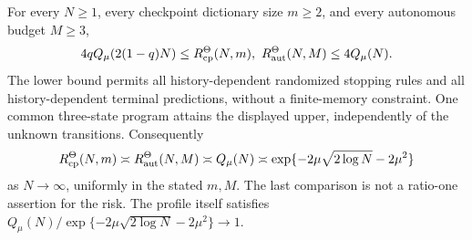 \begin{theorem}\label{thm:gaussian-all}
For every $N\ge1$, every checkpoint dictionary size $m\ge2$, and every autonomous budget $M\ge3$,
\begin{equation}\label{eq:gaussian-sandwich}
 4qQ_\mu(2(1-q)N)
 \le R_{\mathrm{cp}}^\Theta(N,m),\ R_{\mathrm{aut}}^\Theta(N,M)
 \le4Q_\mu(N).
\end{equation}
The lower bound permits all history-dependent randomized stopping rules and all history-dependent terminal predictions, without a finite-memory constraint. One common three-state program attains the displayed upper, independently of the unknown transitions. Consequently
\begin{equation}\label{eq:gaussian-order}
 R_{\mathrm{cp}}^\Theta(N,m)\asymp R_{\mathrm{aut}}^\Theta(N,M)
 \asymp Q_\mu(N)
 \asymp \exp\{-2\mu\sqrt{2\log N}-2\mu^2\}
\end{equation}
as $N\to\infty$, uniformly in the stated $m,M$. The last comparison is not a ratio-one assertion for the risk. The profile itself satisfies
$Q_\mu(N)/\exp\{-2\mu\sqrt{2\log N}-2\mu^2\}\to1$.
\end{theorem}
